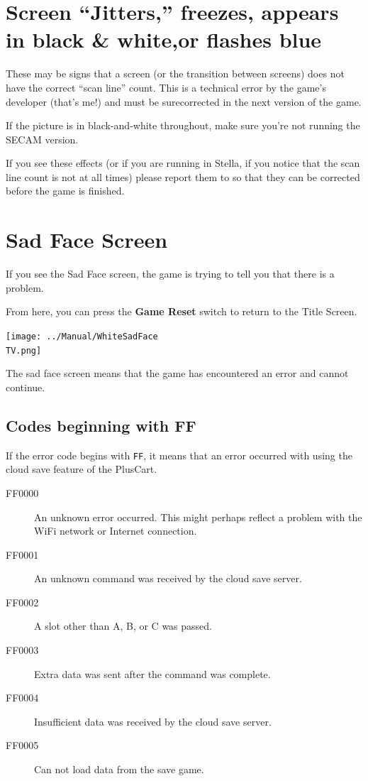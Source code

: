 \documentclass[10pt,twocolumn,openany,article]{memoir}
\newcommand\TV{NTSC}
\newcommand\TV{PAL}
\newcommand\TV{SECAM}
\begin{document}
\section{Screen ``Jitters,'' freezes,  \ifdefined\TVPAL appears in black
  \& white,\fi or flashes blue}

These may  be signs that  a screen  (or the transition  between screens)
does not have the correct ``scan line'' count. This is a technical error
by the game's  developer (that's me!) and must be  surecorrected in the next
version of the game.

\ifdefined\TVPAL
If the  picture is in  black-and-white throughout, make sure  you're not
running the SECAM version.
\fi

If you see these effects (or if you are running in Stella, if you notice
that the scan  line count is not \ifdefined{}   \fi at
all         times)         please         report         them         to
 so  that they
can be corrected before the game is finished.

\fi

\section{Sad Face Screen}

If you  see the Sad  Face screen,  the game is  trying to tell  you that
there is a problem.

From here, you can press the \textbf{Game Reset} switch to return to the
Title Screen.

\texttt{[image: ../Manual/WhiteSadFace\\TV.png]}

The sad  face screen means  that the game  has encountered an  error and
cannot continue.

\ifdefined\PLUSCART

\subsection{Codes beginning with FF}

If  the error  code  begins with  \texttt{FF}, it  means  that an  error
occurred with using the cloud save feature of the PlusCart.

\begin{description}
\item[FF0000]  An unknown  error  occurred. This  might perhaps  reflect
  a problem with the WiFi network or Internet connection.
\item[FF0001] An unknown command was received by the cloud save server.
\item[FF0002] A slot other than A, B, or C was passed.
\item[FF0003] Extra data was sent after the command was complete.
\item[FF0004] Insufficient data was received by the cloud save server.
\item[FF0005] Can not load data from the save game.
\end{description}
\end{document}

